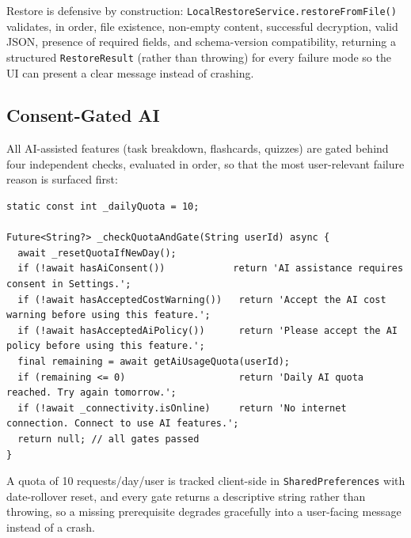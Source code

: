 \documentclass[11pt,a4paper]{article}
\begin{document}
Restore is defensive by construction: \texttt{LocalRestoreService.restoreFromFile()} validates, in order, file existence, non-empty content, successful decryption, valid JSON, presence of required fields, and schema-version compatibility, returning a structured \texttt{RestoreResult} (rather than throwing) for every failure mode so the UI can present a clear message instead of crashing.

\subsection{Consent-Gated AI}
All AI-assisted features (task breakdown, flashcards, quizzes) are gated behind four independent checks, evaluated in order, so that the most user-relevant failure reason is surfaced first:

\begin{lstlisting}[caption={AI request gating --- \texttt{lib/services/ai\_service.dart}}]
static const int _dailyQuota = 10;

Future<String?> _checkQuotaAndGate(String userId) async {
  await _resetQuotaIfNewDay();
  if (!await hasAiConsent())            return 'AI assistance requires consent in Settings.';
  if (!await hasAcceptedCostWarning())   return 'Accept the AI cost warning before using this feature.';
  if (!await hasAcceptedAiPolicy())      return 'Please accept the AI policy before using this feature.';
  final remaining = await getAiUsageQuota(userId);
  if (remaining <= 0)                    return 'Daily AI quota reached. Try again tomorrow.';
  if (!await _connectivity.isOnline)     return 'No internet connection. Connect to use AI features.';
  return null; // all gates passed
}
\end{lstlisting}

A quota of 10 requests/day/user is tracked client-side in \texttt{SharedPreferences} with date-rollover reset, and every gate returns a descriptive string rather than throwing, so a missing prerequisite degrades gracefully into a user-facing message instead of a crash.
\end{document}
